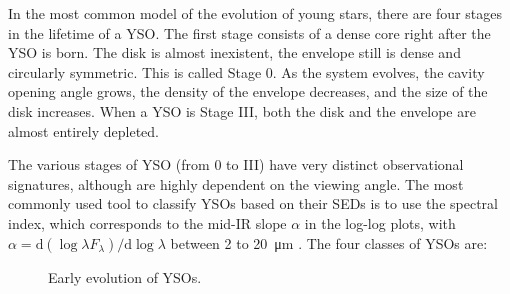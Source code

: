 In the most common model of the evolution of young stars, there are four stages in the lifetime of a YSO. The first stage consists of a dense core right after the YSO is born. The disk is almost inexistent, the envelope still is dense and circularly symmetric. This is called Stage 0. As the system evolves, the cavity opening angle grows, the density of the envelope decreases, and the size of the disk increases. When a YSO is Stage III, both the disk and the envelope are almost entirely depleted.

The various stages of YSO (from 0 to III) have very distinct observational signatures, although are highly dependent on the viewing angle. The most commonly used tool to classify YSOs based on their SEDs is to use the spectral index, which corresponds to the mid-IR slope $\alpha$ in the log-log plots, with $\alpha = \textrm{d}(\log\lambda F_\lambda)/\textrm{d}\log\lambda$ between 2 to \SI{20}{\micro\meter} \citep{McKee:2007bd}. The four classes of YSOs are:


\begin{figure}[!h]
\begin{center}
 \par\medskip
{} 
\caption[Early evolution of YSOs]{Early evolution of YSOs.}
\label{fig:EarlyStages}
\end{center}
\end{figure}

